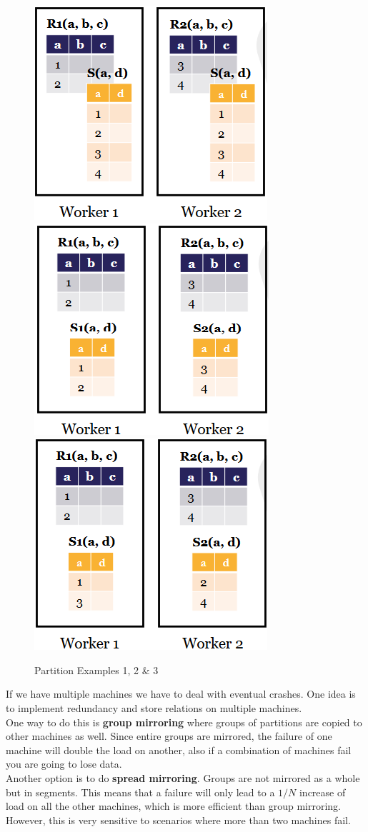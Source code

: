 \begin{figure}[H]
\centering
\includegraphics[width=.3\textwidth]{images/example1.PNG}
\includegraphics[width=.31\textwidth]{images/example2.PNG}
\includegraphics[width=.3\textwidth]{images/example3.PNG}
\label{partition_examples}
\caption{Partition Examples 1, 2 \& 3}
\end{figure}
If we have multiple machines we have to deal with eventual crashes. One idea is to implement redundancy and store relations on multiple machines.\\
One way to do this is \textbf{group mirroring} where groups of partitions are copied to other machines as well. Since entire groups are mirrored, the failure of one machine will double the load on another, also if a combination of machines fail you are going to lose data.\\
Another option is to do \textbf{spread mirroring}. Groups are not mirrored as a whole but in segments. This means that a failure will only lead to a $1/N$ increase of load on all the other machines, which is more efficient than group mirroring. However, this is very sensitive to scenarios where more than two machines fail.
